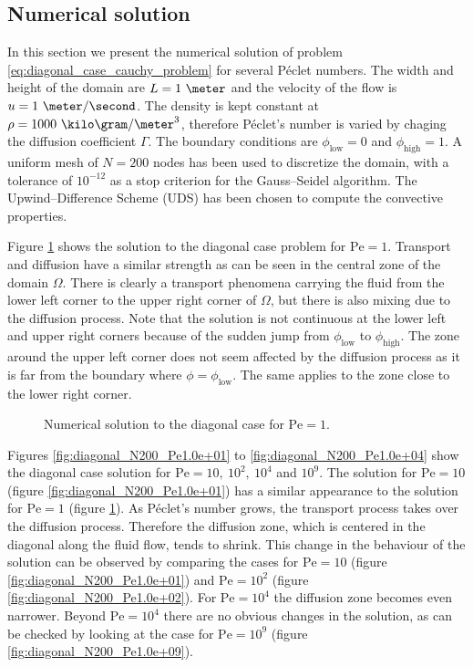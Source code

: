
\subsection{Numerical solution}

In this section we present the numerical solution of problem \eqref{eq:diagonal_case_cauchy_problem} for several Péclet numbers. The width and height of the domain are $L = 1 \ \meter$ and the velocity of the flow is $u = 1 \ \meter / \second$. The density is kept constant at $\rho = 1000 \ \kilo\gram / \meter^3$, therefore Péclet's number is varied by chaging the diffusion coefficient $\Gamma$. The boundary conditions are $\phi_\text{low} = 0$ and $\phi_\text{high} = 1$. A uniform mesh of $N = 200$ nodes has been used to discretize the domain, with a tolerance of $10^{-12}$ as a stop criterion for the Gauss--Seidel algorithm. The Upwind--Difference Scheme (UDS) has been chosen to compute the convective properties.

Figure \ref{fig:diagonal_N200_Pe1.0e+00} shows the solution to the diagonal case problem for $\mathrm{Pe} = 1$. Transport and diffusion have a similar strength as can be seen in the central zone of the domain $\Omega$. There is clearly a transport phenomena carrying the fluid from the lower left corner to the upper right corner of $\Omega$, but there is also mixing due to the diffusion process. Note that the solution is not continuous at the lower left and upper right corners because of the sudden jump from $\phi_\text{low}$ to $\phi_\text{high}$. The zone around the upper left corner does not seem affected by the diffusion process as it is far from the boundary where $\phi = \phi_\text{low}$. The same applies to the zone close to the lower right corner.

\begin{figure}[h]
	\centering
	\vspace{-0.75cm}
	
	\vspace{-0.50cm}
	\caption{Numerical solution to the diagonal case for $\mathrm{Pe} = 1$.}
	\label{fig:diagonal_N200_Pe1.0e+00}
\end{figure}

\clearpage
Figures \eqref{fig:diagonal_N200_Pe1.0e+01} to \eqref{fig:diagonal_N200_Pe1.0e+04} show the diagonal case solution for $\mathrm{Pe} = 10, \ 10^2, \ 10^4$ and $10^9$. The solution for $\mathrm{Pe} = 10$ (figure \ref{fig:diagonal_N200_Pe1.0e+01}) has a similar appearance to the solution for $\mathrm{Pe} = 1$ (figure \ref{fig:diagonal_N200_Pe1.0e+00}). As Péclet's number grows, the transport process takes over the diffusion process. Therefore the diffusion zone, which is centered in the diagonal along the fluid flow, tends to shrink. This change in the behaviour of the solution can be observed by comparing the cases for $\mathrm{Pe} = 10$ (figure \ref{fig:diagonal_N200_Pe1.0e+01}) and $\mathrm{Pe} = 10^2$ (figure \ref{fig:diagonal_N200_Pe1.0e+02}). For $\mathrm{Pe} = 10^4$ the diffusion zone becomes even narrower. Beyond $\mathrm{Pe} = 10^4$ there are no obvious changes in the solution, as can be checked by looking at the case for $\mathrm{Pe} = 10^9$ (figure \ref{fig:diagonal_N200_Pe1.0e+09}).

